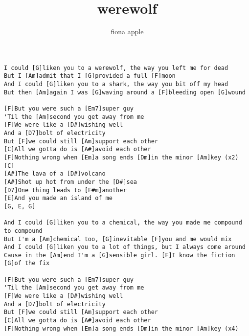\author{fiona apple}
\title{werewolf}
\maketitle
\begin{verbatim}
I could [G]liken you to a werewolf, the way you left me for dead
But I [Am]admit that I [G]provided a full [F]moon
And I could [G]liken you to a shark, the way you bit off my head
But then [Am]again I was [G]waving around a [F]bleeding open [G]wound

[F]But you were such a [Em7]super guy
'Til the [Am]second you get away from me
[F]We were like a [D#]wishing well
And a [D7]bolt of electricity
But [F]we could still [Am]support each other
[C]All we gotta do is [A#]avoid each other
[F]Nothing wrong when [Em]a song ends [Dm]in the minor [Am]key (x2)
[C]
[A#]The lava of a [D#]volcano
[A#]Shot up hot from under the [D#]sea
[D7]One thing leads to [F#m]another
[E]And you made an island of me
[G, E, G]

And I could [G]liken you to a chemical, the way you made me compound to compound
But I'm a [Am]chemical too, [G]inevitable [F]you and me would mix
And I could [G]liken you to a lot of things, but I always come around
Cause in the [Am]end I'm a [G]sensible girl. [F]I know the fiction [G]of the fix

[F]But you were such a [Em7]super guy
'Til the [Am]second you get away from me
[F]We were like a [D#]wishing well
And a [D7]bolt of electricity
But [F]we could still [Am]support each other
[C]All we gotta do is [A#]avoid each other
[F]Nothing wrong when [Em]a song ends [Dm]in the minor [Am]key (x4)
\end{verbatim}